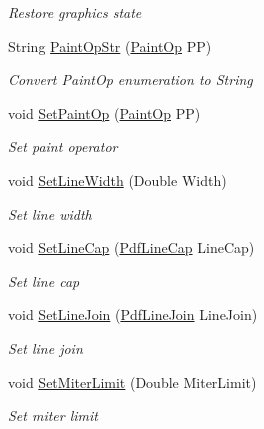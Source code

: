 \begin{DoxyCompactItemize}
\begin{DoxyCompactList}\small\item\em Restore graphics state \end{DoxyCompactList}\item 
String \hyperlink{class_pdf_file_writer_1_1_pdf_contents_a5bc8feca74583ca964512f1e54f57109}{Paint\+Op\+Str} (\hyperlink{namespace_pdf_file_writer_a1bd0bc3fdabed20e2459496f1bbe2101}{Paint\+Op} PP)
\begin{DoxyCompactList}\small\item\em Convert Paint\+Op enumeration to String \end{DoxyCompactList}\item 
void \hyperlink{class_pdf_file_writer_1_1_pdf_contents_a000ff851d9135737eb02b510cf580e1e}{Set\+Paint\+Op} (\hyperlink{namespace_pdf_file_writer_a1bd0bc3fdabed20e2459496f1bbe2101}{Paint\+Op} PP)
\begin{DoxyCompactList}\small\item\em Set paint operator \end{DoxyCompactList}\item 
void \hyperlink{class_pdf_file_writer_1_1_pdf_contents_a5aac13f0733d013ee6414ff2fc9d22d9}{Set\+Line\+Width} (Double Width)
\begin{DoxyCompactList}\small\item\em Set line width \end{DoxyCompactList}\item 
void \hyperlink{class_pdf_file_writer_1_1_pdf_contents_ab4a682a067ba6f35f4d7e56c7dd0e421}{Set\+Line\+Cap} (\hyperlink{namespace_pdf_file_writer_a5bacfcf7dd7ff88412b7b510062d2c1d}{Pdf\+Line\+Cap} Line\+Cap)
\begin{DoxyCompactList}\small\item\em Set line cap \end{DoxyCompactList}\item 
void \hyperlink{class_pdf_file_writer_1_1_pdf_contents_a6adf3577d023159b1f103bb5f7e58b2e}{Set\+Line\+Join} (\hyperlink{namespace_pdf_file_writer_a6f6d39447d0d063d26d898311f8aafed}{Pdf\+Line\+Join} Line\+Join)
\begin{DoxyCompactList}\small\item\em Set line join \end{DoxyCompactList}\item 
void \hyperlink{class_pdf_file_writer_1_1_pdf_contents_a724ef65546b5854a3dc2c1ccffb32dfa}{Set\+Miter\+Limit} (Double Miter\+Limit)
\begin{DoxyCompactList}\small\item\em Set miter limit \end{DoxyCompactList}\item 

\end{DoxyCompactItemize}

